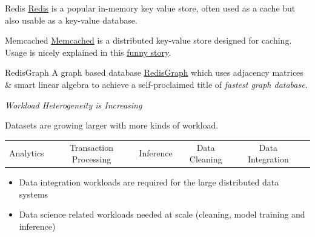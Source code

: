 \begin{tcbraster}[raster columns=2,raster equal height]
\begin{sidenotebox}{Redis}
    \href{https://redis.io/}{Redis} is a popular in-memory key value store, often used as a cache but also usable as a key-value database. 
\end{sidenotebox}
\begin{sidenotebox}{Memcached}
    \href{https://github.com/memcached/memcached}{Memcached} is a distributed key-value store designed for caching. Usage is nicely explained in this \href{https://github.com/memcached/memcached/wiki/TutorialCachingStory}{funny story}.
\end{sidenotebox}
\end{tcbraster}
\begin{sidenotebox}{RedisGraph}
    A graph based database \href{https://redis.com/modules/redis-graph/}{RedisGraph} which uses adjacency matrices \& smart linear algebra to achieve a self-proclaimed title of \textit{fastest graph database}.
\end{sidenotebox}
\centerline{\textit{Workload Heterogeneity is Increasing}}
Datasets are growing larger with more kinds of workload.
\begin{center}
    \begin{tabular}{c c c c c c}
        Analytics & Transaction Processing & Inference & Data Cleaning & Data Integration \\ 
    \end{tabular}
\end{center}
\begin{itemize}
    \item Data integration workloads are required for the large distributed data systems
    \item Data science related workloads needed at scale (cleaning, model training and inference)
\end{itemize}

